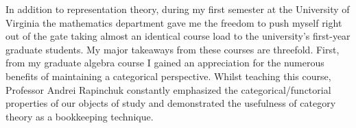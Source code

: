 \documentclass[11pt]{article}
\begin{document}
%


In addition to representation theory, during my first semester at the University of Virginia the mathematics department gave me the freedom to push myself right out of the gate taking almost an identical course load to the university's first-year graduate students. My major takeaways from these courses are threefold. First, from my graduate algebra course I gained an appreciation for the numerous benefits of maintaining a categorical perspective. Whilst teaching this course, Professor Andrei Rapinchuk constantly emphasized the categorical/functorial properties of our objects of study and demonstrated the usefulness of category theory as a bookkeeping technique.
\end{document}
